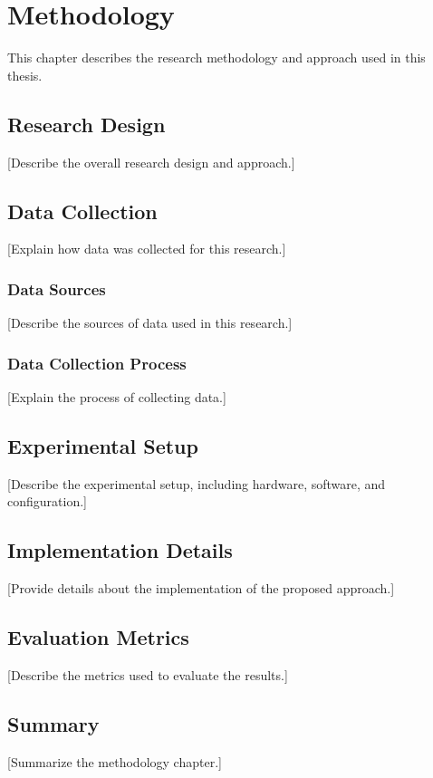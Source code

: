 \chapter{Methodology}
\label{ch:methodology}

This chapter describes the research methodology and approach used in this thesis.

\section{Research Design}
\label{sec:research-design}

[Describe the overall research design and approach.]

\section{Data Collection}
\label{sec:data-collection}

[Explain how data was collected for this research.]

\subsection{Data Sources}
\label{subsec:data-sources}

[Describe the sources of data used in this research.]

\subsection{Data Collection Process}
\label{subsec:data-collection-process}

[Explain the process of collecting data.]

\section{Experimental Setup}
\label{sec:experimental-setup}

[Describe the experimental setup, including hardware, software, and configuration.]

\section{Implementation Details}
\label{sec:implementation}

[Provide details about the implementation of the proposed approach.]

\section{Evaluation Metrics}
\label{sec:evaluation-metrics}

[Describe the metrics used to evaluate the results.]

\section{Summary}
\label{sec:method-summary}

[Summarize the methodology chapter.]
